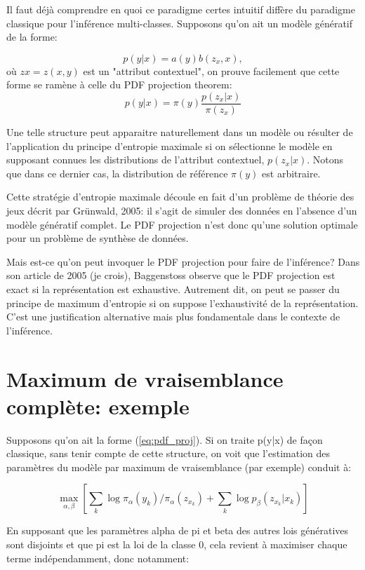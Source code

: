 \documentclass{article}
\begin{document}
Il faut d\'ej\`a comprendre en quoi ce paradigme certes intuitif diff\`ere du paradigme classique pour l'inf\'erence multi-classes. Supposons qu'on ait un mod\`ele g\'en\'eratif de la forme: 

$$
p(y|x) = a(y) b(z_x, x),
$$ 
o\`u $zx = z(x, y)$ est un "attribut contextuel", on prouve facilement que cette forme se ram\`ene \`a celle du PDF projection theorem: 
\begin{equation}
\label{eq:pdf_proj}
p(y|x) = \pi(y) \frac{p(z_x|x)}{\pi(z_x)}
\end{equation}

Une telle structure peut apparaitre naturellement dans un mod\`ele ou r\'esulter de l'application du principe d'entropie maximale si on s\'electionne le mod\`ele en supposant connues les distributions de l'attribut contextuel, $p(z_x|x)$. Notons que dans ce dernier cas, la distribution de r\'ef\'erence $\pi(y)$ est arbitraire.  

Cette strat\'egie d'entropie maximale d\'ecoule en fait d'un probl\`eme de th\'eorie des jeux d\'ecrit par Gr\"unwald, 2005: il s'agit de simuler des donn\'ees en l'absence d'un mod\`ele g\'en\'eratif complet. Le PDF projection n'est donc qu'une solution optimale pour un probl\`eme de synth\`ese de donn\'ees. 

Mais est-ce qu'on peut invoquer le PDF projection pour faire de l'inf\'erence? Dans son article de 2005 (je crois), Baggenstoss observe que le PDF projection est exact si la repr\'esentation est exhaustive. Autrement dit, on peut se passer du principe de maximum d'entropie si on suppose l'exhaustivit\'e de la repr\'esentation. C'est une justification alternative mais plus fondamentale dans le contexte de l'inf\'erence. 

\section{Maximum de vraisemblance compl\`ete: exemple}

Supposons qu'on ait la forme (\ref{eq:pdf_proj}). Si on traite p(y|x) de fa\c{c}on classique, sans tenir compte de cette structure, on voit que l'estimation des param\`etres du mod\`ele par maximum de vraisemblance (par exemple) conduit \`a: 

$$
\max_{\alpha, \beta} \left[
\sum_k \log \pi_\alpha(y_k)/\pi_\alpha(z_{x_k}) + \sum_k \log p_\beta(z_{x_k}|x_k)
\right]
$$ 

En supposant que les param\`etres alpha de pi et beta des autres lois g\'en\'eratives sont disjoints et que pi est la loi de la classe 0, cela revient \`a maximiser chaque terme ind\'ependamment, donc notamment: 
\end{document}
